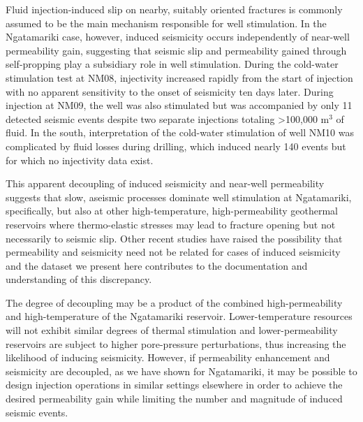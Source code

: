 Fluid injection-induced slip on nearby, suitably oriented fractures is commonly assumed to be the main mechanism responsible for well \gls{stimulation}. In the Ngatamariki case, however, induced seismicity occurs independently of near-well \gls{permeability} gain, suggesting that seismic slip and \gls{permeability} gained through self-propping play a subsidiary role in well \gls{stimulation}. During the cold-water \gls{stimulation} test at NM08, \gls{injectivity} increased rapidly from the start of injection with no apparent sensitivity to the onset of seismicity ten days later. During injection at NM09, the well was also stimulated but was accompanied by only 11 detected seismic events despite two separate injections totaling \textgreater100,000 m$^3$ of fluid. In the south, interpretation of the cold-water \gls{stimulation} of well NM10 was complicated by fluid losses during drilling, which induced nearly 140 events but for which no \gls{injectivity} data exist.

This apparent decoupling of induced seismicity and near-well \gls{permeability} suggests that slow, aseismic processes dominate well \gls{stimulation} at Ngatamariki, specifically, but also at other high-temperature, high-permeability geothermal reservoirs where thermo-elastic stresses may lead to fracture opening but not necessarily to seismic slip. Other recent studies have raised the possibility that \gls{permeability} and seismicity need not be related for cases of induced seismicity \citep[e.g.][]{Guglielmi_2015, Riffault_2018} and the dataset we present here contributes to the documentation and understanding of this discrepancy.

The degree of decoupling may be a product of the combined high-permeability and high-temperature of the Ngatamariki reservoir. Lower-temperature resources will not exhibit similar degrees of thermal \gls{stimulation} and lower-permeability reservoirs are subject to higher pore-pressure perturbations, thus increasing the likelihood of inducing seismicity. However, if \gls{permeability} enhancement and seismicity are decoupled, as we have shown for Ngatamariki, it may be possible to design injection operations in similar settings elsewhere in order to achieve the desired \gls{permeability} gain while limiting the number and magnitude of induced seismic events.

